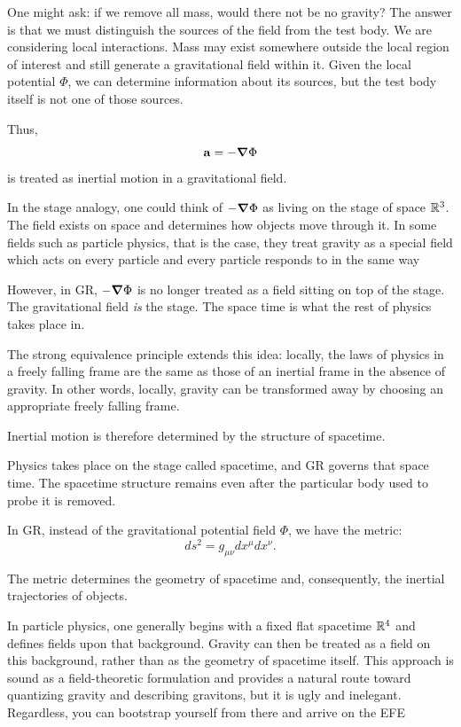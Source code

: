 		One might ask: if we remove all mass, would there not be no gravity? The answer is that we must distinguish the sources of the field from the test body. We are considering local interactions. Mass may exist somewhere outside the local region of interest and still generate a gravitational field within it. Given the local potential $\Phi$, we can determine information about its sources, but the test body itself is not one of those sources.

		Thus,
		\begin{equation}
			\vb{a} = -\grad\Phi
		\end{equation}
		is treated as inertial motion in a gravitational field.

		In the stage analogy, one could think of $-\grad\Phi$ as living on the stage of space $\mathbb{R}^3$. The field exists on space and determines how objects move through it. 
		In some fields such as particle physics, that is the case, they treat gravity as a special field  which acts on every particle and every particle responds to in the same way

		However, in GR, $-\grad\Phi$ is no longer treated as a field sitting on top of the stage. The gravitational field \textit{is} the stage. 
		The space time is what the rest of physics takes place in.

		The strong equivalence principle extends this idea: locally, the laws of physics in a freely falling frame are the same as those of an inertial frame in the absence of gravity. In other words, locally, gravity can be transformed away by choosing an appropriate freely falling frame.

		Inertial motion is therefore determined by the structure of spacetime.

		Physics takes place on the stage called spacetime, and GR governs that space time. The spacetime structure remains even after the particular body used to probe it is removed.

		In GR, instead of the gravitational potential field $\Phi$, we have the metric:
		\begin{equation}
			ds^2 = g_{\mu\nu} dx^\mu dx^\nu.
		\end{equation}

		The metric determines the geometry of spacetime and, consequently, the inertial trajectories of objects.

		In particle physics, one generally begins with a fixed flat spacetime $\mathbb{R}^4$ and defines fields upon that background. Gravity can then be treated as a field on this background, rather than as the geometry of spacetime itself. This approach is sound as a field-theoretic formulation and provides a natural route toward quantizing gravity and describing gravitons, but it is ugly and inelegant. Regardless, you can bootstrap yourself from there and arrive on the EFE

